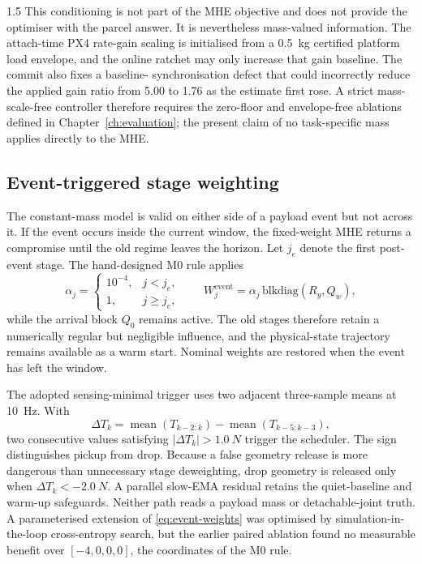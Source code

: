 \begin{spacing}{1.5}
This conditioning is not part of the MHE objective and does not provide
the optimiser with the parcel answer. It is nevertheless mass-valued
information. The attach-time PX4 rate-gain scaling is initialised from a
\SI{0.5}{kg} certified platform load envelope, and the online ratchet may
only increase that gain baseline. The commit also fixes a baseline-
synchronisation defect that could incorrectly reduce the applied gain
ratio from 5.00 to 1.76 as the estimate first rose. A strict
mass-scale-free controller therefore requires the zero-floor and
envelope-free ablations defined in Chapter~\ref{ch:evaluation}; the
present claim of no task-specific mass applies directly to the MHE.

\subsection{Event-triggered stage weighting}

The constant-mass model is valid on either side of a payload event but not across it. If the event occurs inside the current window, the fixed-weight MHE returns a compromise until the old regime leaves the horizon. Let $j_e$ denote the first post-event stage. The hand-designed M0 rule applies
\begin{equation}
\alpha_j=
\begin{cases}
10^{-4}, & j<j_e,\\
1, & j\ge j_e,
\end{cases}
\qquad
W_j^{\mathrm{event}}=\alpha_j\,\mathrm{blkdiag}(R_y,Q_w),
\label{eq:event-weights}
\end{equation}
while the arrival block $Q_0$ remains active. The old stages therefore retain a numerically regular but negligible influence, and the physical-state trajectory remains available as a warm start. Nominal weights are restored when the event has left the window.

The adopted sensing-minimal trigger uses two adjacent
three-sample means at \SI{10}{Hz}. With
\[
\Delta T_k=\operatorname{mean}(T_{k-2:k})
-\operatorname{mean}(T_{k-5:k-3}),
\]
two consecutive values satisfying $|\Delta T_k|>\SI{1.0}{N}$ trigger
the scheduler. The sign distinguishes pickup from drop. Because a false
geometry release is more dangerous than unnecessary stage deweighting,
drop geometry is released only when
$\Delta T_k<-\SI{2.0}{N}$. A parallel slow-EMA residual retains the
quiet-baseline and warm-up safeguards. Neither path reads a payload mass
or detachable-joint truth. A parameterised extension of
\eqref{eq:event-weights} was optimised by simulation-in-the-loop
cross-entropy search, but the earlier paired ablation found no measurable
benefit over $[-4,0,0,0]$, the coordinates of the M0 rule.


\end{spacing}
